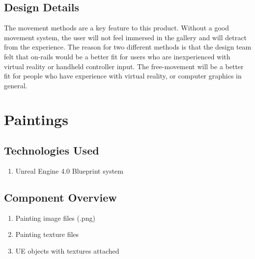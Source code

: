 

\subsection{Design Details}
The movement methods are a key feature to this product.  Without a good movement system, the user will not feel immersed in the gallery and will detract from the experience.  The reason for two different methods is that the design team felt that on-rails would be a better fit for users who are inexperienced with virtual reality or handheld controller input.  The free-movement will be a better fit for people who have experience with virtual reality, or computer graphics in general.




\section{Paintings }

\subsection{Technologies  Used}
\begin{enumerate}
\item Unreal Engine 4.0 Blueprint system
\end{enumerate}

\subsection{Component  Overview}
\begin{enumerate}
\item Painting image files (.png)
\item Painting texture files
\item UE objects with textures attached
\end{enumerate}


